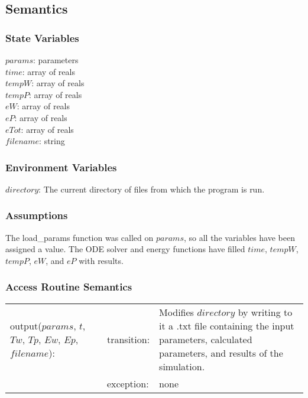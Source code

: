 \documentclass[12pt]{article}
\begin{document}
\subsection{Semantics}
\subsubsection{State Variables}
$params$: parameters \\
$time$: array of reals \\
$tempW$: array of reals \\
$tempP$: array of reals \\
$eW$: array of reals \\
$eP$: array of reals \\
$eTot$: array of reals \\
$filename$: string
\subsubsection{Environment Variables}
$directory$: The current directory of files from which the program is run.
\subsubsection{Assumptions}
The load\_params function was called on $params$, so all the variables have been assigned a value. The ODE solver and energy functions have filled $time$, $tempW$, $tempP$, $eW$, and $eP$ with results.
\subsubsection{Access Routine Semantics}
\begin{center}
\begin{tabular}{l l p{6cm}}
output($params$, $t$, $Tw$, $Tp$, $Ew$, $Ep$, $filename$): & transition: & Modifies $directory$ by writing to it a .txt file containing the input parameters, calculated parameters, and results of the simulation. \\
& exception: & none \\
\end{tabular}
\end{center}
\end{document}
